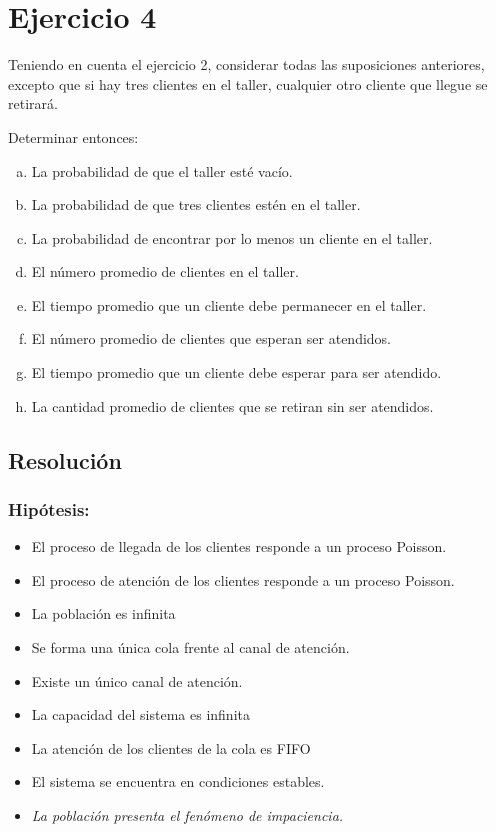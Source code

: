 \documentclass[a4paper,11pt]{article}
\begin{document}
\vspace{35pt}
\section{\textbf{Ejercicio 4}}

Teniendo en cuenta el ejercicio 2, considerar todas las suposiciones
anteriores, excepto que si hay tres clientes en el taller, cualquier otro
cliente que llegue se retirará.

Determinar entonces:

\leftskip=36pt
\parindent=-18pt
\begin{enumerate}[a)]
  \item La probabilidad de que el taller esté vacío.
  \item La probabilidad de que tres clientes estén en el taller.
  \item La probabilidad de encontrar por lo menos un cliente en el taller.
  \item El número promedio de clientes en el taller.
  \item El tiempo promedio que un cliente debe permanecer en el taller.
  \item El número promedio de clientes que esperan ser atendidos.
  \item El tiempo promedio que un cliente debe esperar para ser atendido.
  \item La cantidad promedio de clientes que se retiran sin ser atendidos.
\end{enumerate}

\vspace{13pt}
\leftskip=0pt
\parindent=0pt
\subsection{\textbf{Resolución}}

\vspace{5pt}
\leftskip=0pt
\parindent=0pt
\subsubsection*{Hipótesis:}

\leftskip=36pt
\parindent=-18pt
\begin{itemize}
  \item El proceso de llegada de los clientes responde a un proceso Poisson.
  \item El proceso de atención de los clientes responde a un proceso Poisson.
  \item La población es infinita
  \item Se forma una única cola frente al canal de atención.
  \item Existe un único canal de atención.
  \item La capacidad del sistema es infinita
  \item La atención de los clientes de la cola es FIFO
  \item El sistema se encuentra en condiciones estables.
  \item \textit{La población presenta el fenómeno de impaciencia.}
\end{itemize}
\end{document}
